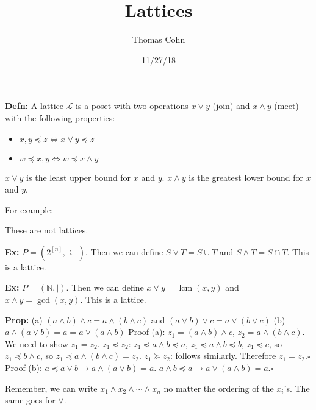 \documentclass[10pt,letterpaper]{article}
\author{Thomas Cohn}
\title{Lattices}
\date{11/27/18} %
\newcommand{\n}{\hfill\break}
\newcommand{\defn}[1]{\par\noindent\settowidth{\hangindent}{\textbf{Defn: }}\textbf{Defn: }#1\n}
\newcommand{\prop}[1]{\par\noindent\settowidth{\hangindent}{\textbf{Prop: }}\textbf{Prop: }#1\n}
\newcommand{\ex}[1]{\par\noindent\settowidth{\hangindent}{\textbf{Ex: }}\textbf{Ex: }#1\n}
\newcommand{\proven}{\;$\square$\n}
\newcommand{\naturals}{\mathbb{N}}
\newcommand{\N}{\naturals}
\DeclareMathOperator{\lcm}{lcm}
\begin{document}
\maketitle
\setlength\RaggedRightParindent{\parindent}
\RaggedRight

\defn{A \underline{lattice} $\mathcal{L}$ is a poset with two operations $x\vee{}y$ (join) and $x\wedge{}y$ (meet) with the following properties:
\begin{itemize}
	\item $x,y\preceq{}z\Leftrightarrow{}x\vee{}y\preceq{}z$
	\item $w\preceq{}x,y\Leftrightarrow{}w\preceq{}x\wedge{}y$
\end{itemize}\n
$x\vee{}y$ is the least upper bound for $x$ and $y$.\n
$x\wedge{}y$ is the greatest lower bound for $x$ and $y$.}

\par\noindent For example:


\par\noindent These are not lattices.\n

\ex{$P=(2^{[n]},\subseteq)$. Then we can define $S\vee{}T=S\cup{}T$ and $S\wedge{}T=S\cap{}T$. This is a lattice.}

\ex{$P=(\N,\mid)$. Then we can define $x\vee{}y=\lcm(x,y)$ and $x\wedge{}y=\gcd(x,y)$. This is a lattice.}

\prop{(a) $(a\wedge{}b)\wedge{}c=a\wedge{}(b\wedge{}c)$ and $(a\vee{}b)\vee{}c=a\vee{}(b\vee{}c)$\n
(b) $a\wedge{}(a\vee{}b)=a=a\vee{}(a\wedge{}b)$\n
Proof (a): $z_{1}=(a\wedge{}b)\wedge{}c$, $z_{2}=a\wedge{}(b\wedge{}c)$. We need to show $z_{1}=z_{2}$.\n
$z_{1}\preceq{}z_{2}$: $z_{1}\preceq{}a\wedge{}b\preceq{}a$, $z_{1}\preceq{}a\wedge{}b\preceq{}b$, $z_{1}\preceq{}c$, so $z_{1}\preceq{}b\wedge{}c$, so $z_{1}\preceq{}a\wedge(b\wedge{}c)=z_{2}$.\n
$z_{1}\succeq{}z_{2}$: follows similarly.\n
Therefore $z_{1}=z_{2}$.\proven
Proof (b): $a\preceq{}a\vee{}b\to{}a\wedge(a\vee{}b)=a$. $a\wedge{}b\preceq{}a\to{}a\vee(a\wedge{}b)=a$.\proven}

\par\noindent Remember, we can write $x_{1}\wedge{}x_{2}\wedge\cdots\wedge{}x_{n}$ no matter the ordering of the $x_{i}$'s. The same goes for $\vee$.\n
\end{document}
